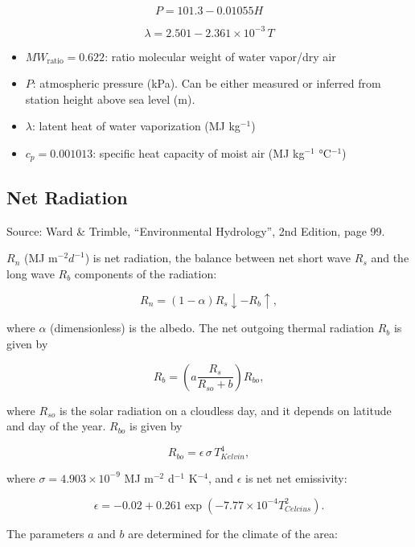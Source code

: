 \documentclass[
  letterpaper,
  DIV=11,
  numbers=noendperiod]{scrreprt}
\providecommand{\tightlist}{%
  \setlength{\itemsep}{0pt}\setlength{\parskip}{0pt}}\usepackage{longtable,booktabs,array}
\begin{document}
\[
  \begin{equation}
    P = 101.3-0.01055 H
  \end{equation}
  \]

\[
  \begin{equation}
    \lambda = 2.501 - 2.361\times 10^{-3}\,T
  \end{equation}
  \]

\begin{itemize}
\tightlist
\item
  \(MW_\text{ratio}=0.622\): ratio molecular weight of water vapor/dry
  air
\item
  \(P\): atmospheric pressure (kPa). Can be either measured or inferred
  from station height above sea level (m).
\item
  \(\lambda\): latent heat of water vaporization (MJ kg\(^{-1}\))
\item
  \(c_p=0.001013\): specific heat capacity of moist air (MJ kg\(^{-1}\)
  °C\(^{-1}\))
\end{itemize}

\hypertarget{net-radiation}{%
\subsection{Net Radiation}\label{net-radiation}}

Source: Ward \& Trimble, ``Environmental Hydrology'', 2nd Edition, page
99.

\(R_n\) (MJ m\(^{-2} d^{-1}\)) is net radiation, the balance between net
short wave \(R_s\) and the long wave \(R_b\) components of the
radiation:

\[R_n = (1-\alpha)R_s\!\! \downarrow -R_b \!\! \uparrow,\]

where \(\alpha\) (dimensionless) is the albedo. The net outgoing thermal
radiation \(R_b\) is given by

\[R_b = \left( a\frac{R_s}{R_{so}+b} \right)R_{bo},\]

where \(R_{so}\) is the solar radiation on a cloudless day, and it
depends on latitude and day of the year. \(R_{bo}\) is given by

\[R_{bo} = \epsilon\, \sigma\, T^4_{Kelvin},\]

where \(\sigma=4.903\times 10^{-9}\) MJ m\(^{-2}\) d\(^{-1}\)
K\(^{-4}\), and \(\epsilon\) is net net emissivity:

\[\epsilon=-0.02+0.261 \exp\left(-7.77\times10^{-4}T_{Celcius}^2\right).\]

The parameters \(a\) and \(b\) are determined for the climate of the
area:
\end{document}
